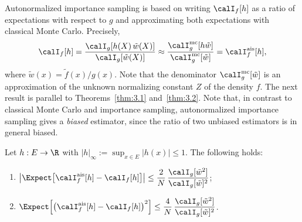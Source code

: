 Autonormalized importance sampling is based on writing $\calI_f[h]$ as a ratio
of expectations with respect to $g$ and approximating both expectations with
classical Monte Carlo. Precisely,
\[
  \calI_f[h]
  = \frac{\calI_g[h(X)\,\tilde{w}(X)]}{\calI_g[\tilde{w}(X)]}
  \approx
  \frac{\calI_g^{\mathrm{mc}}[h\tilde{w}]}{\calI_g^{\mathrm{mc}}[\tilde{w}]}
  = \calI_f^{\mathrm{ais}}[h],
\]
where $\tilde{w}(x) = \tilde{f}(x)/g(x)$. Note that the denominator
$\calI_g^{\mathrm{mc}}[\tilde{w}]$ is an approximation of the unknown
normalizing constant $Z$ of the density $f$. The next result is parallel to
Theorems~\ref{thm:3.1} and~\ref{thm:3.2}. Note that, in contrast to classical
Monte Carlo and importance sampling, autonormalized importance sampling gives a
\emph{biased} estimator, since the ratio of two unbiased estimators is in
general biased.

\begin{theorem}
\label{thm:3.5}
Let $h : E \to \R$ with $|h|_\infty := \sup_{x \in E} |h(x)| \leq 1$. The
following holds:
\begin{enumerate}
  \item $\displaystyle\left|\Expect\!\left[\calI_f^{\mathrm{ais}}[h]
        - \calI_f[h]\right]\right|
        \leq \frac{2}{N}\,
        \frac{\calI_g[\tilde{w}^2]}{\calI_g[\tilde{w}]^2}$;
  \item $\displaystyle\Expect\!\left[\left(\calI_f^{\mathrm{ais}}[h]
        - \calI_f[h]\right)^2\right]
        \leq \frac{4}{N}\,
        \frac{\calI_g[\tilde{w}^2]}{\calI_g[\tilde{w}]^2}$.
\end{enumerate}
\end{theorem}

